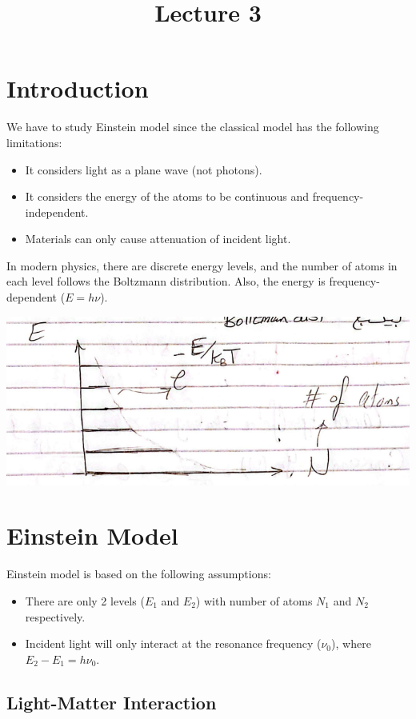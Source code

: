 \documentclass[11pt]{article}
\title{Lecture 3}
\author{}
\date{}
\begin{document}
\maketitle

\section{Introduction}
We have to study Einstein model since the classical model has the following limitations:
\begin{itemize}
    \item It considers light as a plane wave (not photons).
    \item It considers the energy of the atoms to be continuous and frequency-independent.
    \item Materials can only cause attenuation of incident light.
\end{itemize}
In modern physics, there are discrete energy levels, and the number of atoms in each level follows the Boltzmann distribution. Also, the energy is frequency-dependent ($E = h\nu$).
\begin{center}
    \includegraphics[scale=0.7]{1.png}
\end{center}


\section{Einstein Model}
Einstein model is based on the following assumptions:
\begin{itemize}
    \item There are only 2 levels ($E_1$ and $E_2$) with number of atoms $N_1$ and $N_2$ respectively. 
    \item Incident light will only interact at the resonance frequency ($\nu_0$), where $E_2 - E_1 = h\nu_0$.
\end{itemize} 

\subsection{Light-Matter Interaction}
\end{document}
